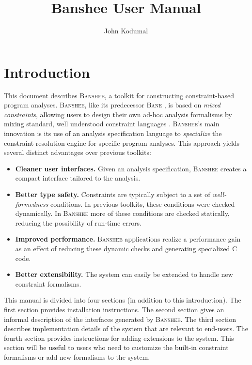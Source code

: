 \documentclass{article}
\title{Banshee User Manual}
\author{John Kodumal}
\newcommand{\bane}{\textsc{Bane}}
\newcommand{\banshee}{\textsc{Banshee}}
\begin{document}
\maketitle

\section{Introduction}

This document describes \banshee{}, a toolkit for constructing
constraint-based program analyses. \banshee{}, like its predecessor
\bane{} \cite{aiken:tic98}, is based on \emph{mixed constraints},
allowing users to design their own ad-hoc analysis formalisms by
mixing standard, well understood constraint languages
\cite{aiken:sas97}. \banshee{}'s main innovation is its use of an
analysis specification language to \emph{specialize} the constraint
resolution engine for specific program analyses. This approach yields
several distinct advantages over previous toolkits:
\begin{itemize}
\item \textbf{Cleaner user interfaces.} Given an analysis
  specification, \banshee{} creates a compact interface tailored to
  the analysis.
\item \textbf{Better type safety.} Constraints are typically subject
  to a set of \emph{well-formedness} conditions. In previous toolkits,
  these conditions were checked dynamically. In \banshee{} more of
  these conditions are checked statically, reducing the possibility of
  run-time errors.
\item \textbf{Improved performance.} \banshee{} applications realize a
  performance gain as an effect of reducing these dynamic checks and
  generating specialized C code.
\item \textbf{Better extensibility.} The system can easily be extended
  to handle new constraint formalisms.
\end{itemize}

This manual is divided into four sections (in addition to this
introduction).  The first section provides installation
instructions. The second section gives an informal description of the
interfaces generated by \banshee{}.  The third section describes
implementation details of the system that are relevant to
end-users. The fourth section provides instructions for adding
extensions to the system. This section will be useful to users who
need to customize the built-in constraint formalisms or add new
formalisms to the system.
\end{document}
